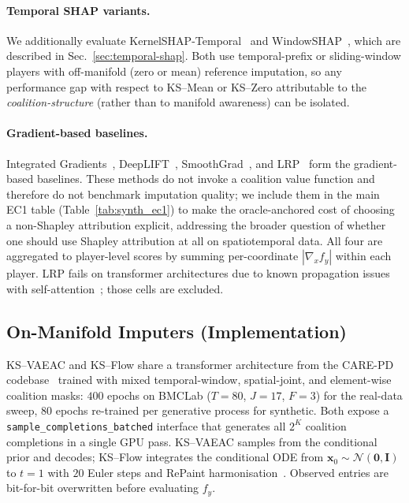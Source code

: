 \paragraph{Temporal SHAP variants.}
We additionally evaluate KernelSHAP-Temporal~\citep{bento2021timeshap}
and WindowSHAP~\citep{nayebi2023windowshap}, which are described in
Sec.~\ref{sec:temporal-shap}.  Both use temporal-prefix or sliding-window
players with off-manifold (zero or mean) reference imputation, so any
performance gap with respect to KS--Mean or KS--Zero attributable to the
\emph{coalition-structure} (rather than to manifold awareness) can be
isolated.

\paragraph{Gradient-based baselines.}
Integrated Gradients~\citep{sundararajan2017axiomatic},
DeepLIFT~\citep{shrikumar2017learning},
SmoothGrad~\citep{smilkov2017smoothgrad}, and
LRP~\citep{bach2015pixel} form the gradient-based baselines.  These
methods do not invoke a coalition value function and therefore do not
benchmark imputation quality; we include them in the main EC1 table
(Table~\ref{tab:synth_ec1}) to make the oracle-anchored cost of
choosing a non-Shapley attribution explicit, addressing the broader
question of whether one should use Shapley attribution at all on
spatiotemporal data.  All four are aggregated to player-level scores by
summing per-coordinate $|\nabla_x f_y|$ within each player.  LRP fails
on transformer architectures due to known propagation issues with
self-attention~\citep{ali2022xai}; those cells are excluded.

\subsection{On-Manifold Imputers (Implementation)}
\label{sec:on-manifold-imputers}

KS--VAEAC and KS--Flow share a transformer architecture from the
CARE-PD codebase~\citep{adeli2025multi} trained with mixed temporal-window,
spatial-joint, and element-wise coalition masks: $400$ epochs on BMCLab
($T{=}80$, $J{=}17$, $F{=}3$) for the real-data sweep, $80$ epochs
re-trained per generative process for synthetic.  Both expose a
\texttt{sample\_completions\_batched} interface that generates all $2^K$
coalition completions in a single GPU pass.  KS--VAEAC samples from the
conditional prior and decodes; KS--Flow integrates the conditional ODE
from $\mathbf{x}_0\!\sim\!\mathcal{N}(\mathbf{0},\mathbf{I})$ to $t{=}1$
with $20$ Euler steps and RePaint harmonisation~\citep{lugmayr2022repaint}.
Observed entries are bit-for-bit overwritten before evaluating $f_y$.

